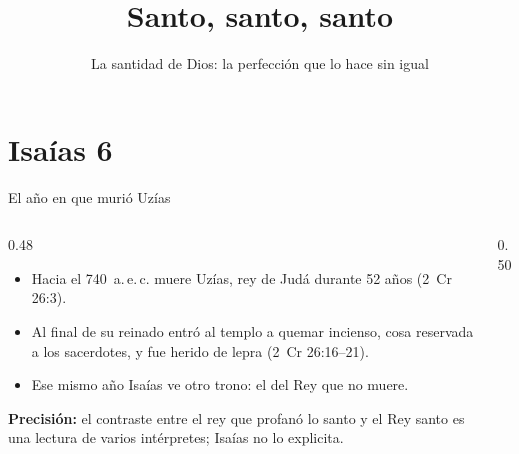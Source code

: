 \documentclass[hyperref={bookmarks=false},aspectratio=169]{beamer}
\title[El Dios santo]{\bfseries{Santo, santo, santo}}
\subtitle{La santidad de Dios: la perfección que lo hace sin igual}
\author{}\institute{}\date{}
\newcommand{\SENOR}{S{\fontsize{0.78em}{1em}\selectfont EÑOR}}
\newcommand{\precision}[1]{{\footnotesize\color{gris}\textbf{Precisión:} #1}}
\begin{document}
\frame{\titlepage}


\section{Isaías 6}

\begin{frame}{El año en que murió Uzías}
\begin{columns}[c,onlytextwidth]
\begin{column}{0.48\textwidth}
\small
\begin{itemize}
\item Hacia el 740~a.\,e.\,c. muere Uzías, rey de Judá durante 52 años (2~Cr 26:3).
\item Al final de su reinado entró al templo a quemar incienso, cosa reservada a los sacerdotes, y fue herido de lepra (2~Cr 26:16--21).
\item Ese mismo año Isaías ve otro trono: el del Rey que no muere.
\end{itemize}
\precision{el contraste entre el rey que profanó lo santo y el Rey santo es una lectura de varios intérpretes; Isaías no lo explicita.}
\end{column}
\begin{column}{0.50\textwidth}
\centering
{}
\end{column}
\end{columns}
\end{frame}
\end{document}
